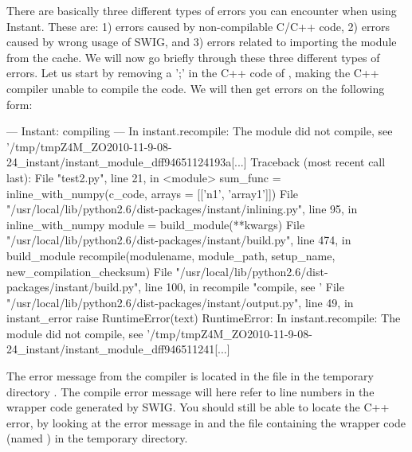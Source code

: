 There are basically three different types of errors you can encounter
when using Instant.  These are: 1) errors caused by non-compilable
C/C++ code, 2) errors caused by wrong usage of SWIG, and 3) errors
related to importing the module from the cache. We will now go briefly
through these three different types of errors. Let us start by
removing a ';' in the C++ code of
, making the C++ compiler unable to compile the code. We will then get errors on the
following form:
\begin{progoutput}
--- Instant: compiling ---
In instant.recompile: The module did not compile,
   see '/tmp/tmpZ4M_ZO2010-11-9-08-24_instant/instant_module_dff94651124193a[...]
Traceback (most recent call last):
      File "test2.py", line 21, in <module>
          sum_func = inline_with_numpy(c_code, arrays = [['n1', 'array1']])
        File "/usr/local/lib/python2.6/dist-packages/instant/inlining.py", line 95, in inline_with_numpy
          module = build_module(**kwargs)
        File "/usr/local/lib/python2.6/dist-packages/instant/build.py", line 474, in build_module
          recompile(modulename, module_path, setup_name, new_compilation_checksum)
        File "/usr/local/lib/python2.6/dist-packages/instant/build.py", line 100, in recompile
          "compile, see '%
        File "/usr/local/lib/python2.6/dist-packages/instant/output.py", line 49, in instant_error
          raise RuntimeError(text)
      RuntimeError: In instant.recompile: The module did not compile,
      see '/tmp/tmpZ4M_ZO2010-11-9-08-24_instant/instant_module_dff946511241[...]
\end{progoutput}
The error message from the compiler is located in the file  in the temporary directory
.
The compile error message will here refer to line numbers in the
wrapper code generated by SWIG.  You should still be able to locate
the C++ error, by looking at the error message in 
and the file containing the wrapper code (named ) in
the temporary directory.

